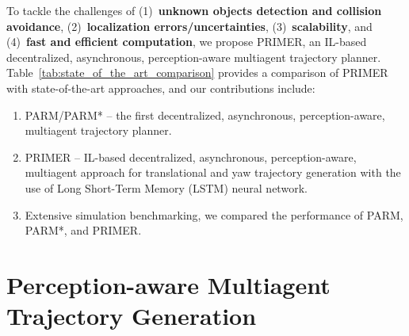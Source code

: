 To tackle the challenges of (1)~\textbf{unknown objects detection and collision avoidance}, (2)~\textbf{localization errors/uncertainties}, (3)~\textbf{scalability}, and (4)~\textbf{fast and efficient computation}, we propose PRIMER, an IL-based decentralized, asynchronous, perception-aware multiagent trajectory planner. Table~\ref{tab:state_of_the_art_comparison} provides a comparison of PRIMER with state-of-the-art approaches, and our contributions include:
%
\begin{enumerate}
    \item PARM/PARM* -- the first decentralized, asynchronous, perception-aware, multiagent trajectory planner.
    \item PRIMER -- IL-based decentralized, asynchronous, perception-aware, multiagent approach for translational and yaw trajectory generation with the use of Long Short-Term Memory (LSTM) neural network.
    \item Extensive simulation benchmarking, we compared the performance of PARM, PARM*, and PRIMER.
\end{enumerate}
%

\section{Perception-aware Multiagent Trajectory Generation}\label{sec:trajectory-generation}



